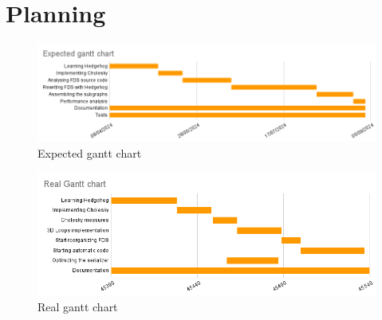 
\clearpage{}
\section{Planning}

\begin{figure}[h!]
  \begin{center}
    \includegraphics[scale=0.5]{img/expected-gantt-chart.png}
    \caption{Expected gantt chart}
    \label{fig:expectedgantt}
  \end{center}
\end{figure}

\begin{figure}[h!]
  \begin{center}
    \includegraphics[scale=0.5]{img/real-gantt-chart.png}
    \caption{Real gantt chart}
    \label{fig:realgantt}
  \end{center}
\end{figure}
